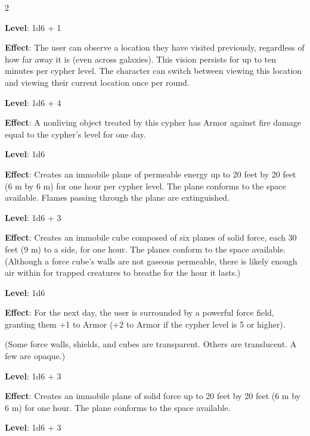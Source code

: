 \begin{multicols}{2}

\textbf{Level}: 1d6 + 1

\textbf{Effect}: The user can observe a location they have visited previously, regardless of how far away it is (even across galaxies). This vision persists for up to ten minutes per cypher level. The character can switch between viewing this location and viewing their current location once per round.


\textbf{Level}: 1d6 + 4

\textbf{Effect}: A nonliving object treated by this cypher has Armor against fire damage equal to the cypher’s level for one day.


\textbf{Level}: 1d6

\textbf{Effect}: Creates an immobile plane of permeable energy up to 20 feet by 20 feet (6 m by 6 m) for one hour per cypher level. The plane conforms to the space available. Flames passing through the plane are extinguished.


\textbf{Level}: 1d6 + 3

\textbf{Effect}: Creates an immobile cube composed of six planes of solid force, each 30 feet (9 m) to a side, for one hour. The planes conform to the space available. (Although a force cube’s walls are not gaseous permeable, there is likely enough air within for trapped creatures to breathe for the hour it lasts.)


\textbf{Level}: 1d6

\textbf{Effect}: For the next day, the user is surrounded by a powerful force field, granting them +1 to Armor (+2 to Armor if the cypher level is 5 or higher).

(Some force walls, shields, and cubes are transparent. Others are translucent. A few are opaque.)


\textbf{Level}: 1d6 + 3

\textbf{Effect}: Creates an immobile plane of solid force up to 20 feet by 20 feet (6 m by 6 m) for one hour. The plane conforms to the space available.


\textbf{Level}: 1d6 + 3


\end{multicols}
